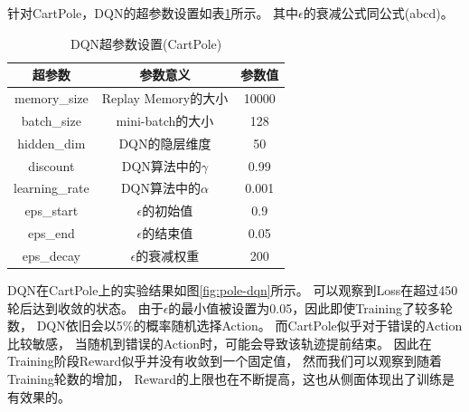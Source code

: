 \documentclass[a4paper,UTF8]{article}
\theoremstyle{definition}
\begin{document}
针对CartPole，DQN的超参数设置如表\ref{tab:pole-dqn}所示。
其中$\epsilon$的衰减公式同公式(abcd)。

\begin{table}[H]
	\centering
	\begin{tabular}{ccc}
		\toprule
		超参数 & 参数意义 & 参数值 \\
		\midrule
		memory\_size & Replay Memory的大小 & 10000 \\
		batch\_size & mini-batch的大小 & 128 \\
		hidden\_dim & DQN的隐层维度 & 50 \\
		discount & DQN算法中的$\gamma$ & 0.99 \\
		learning\_rate & DQN算法中的$\alpha$ & 0.001 \\
		eps\_start & $\epsilon$的初始值 & 0.9 \\
		eps\_end & $\epsilon$的结束值 & 0.05 \\
		eps\_decay & $\epsilon$的衰减权重 & 200 \\
		\bottomrule
	\end{tabular}
	\caption{DQN超参数设置(CartPole)}\label{tab:pole-dqn}
\end{table}

DQN在CartPole上的实验结果如图\ref{fig:pole-dqn}所示。
可以观察到Loss在超过450轮后达到收敛的状态。
由于$\epsilon$的最小值被设置为0.05，因此即使Training了较多轮数，
DQN依旧会以5\%的概率随机选择Action。
而CartPole似乎对于错误的Action比较敏感，
当随机到错误的Action时，可能会导致该轨迹提前结束。
因此在Training阶段Reward似乎并没有收敛到一个固定值，
然而我们可以观察到随着Training轮数的增加，
Reward的上限也在不断提高，这也从侧面体现出了训练是有效果的。
\end{document}
